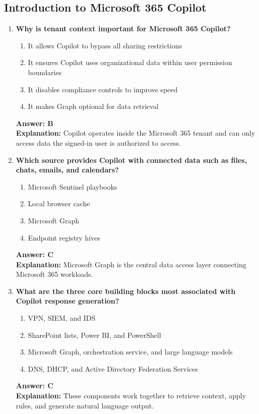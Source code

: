\documentclass[10pt]{article}
\begin{document}
\subsection{Introduction to Microsoft 365 Copilot}
\begin{enumerate}[leftmargin=*]

\item \textbf{Why is tenant context important for Microsoft 365 Copilot?}
\begin{enumerate}[label=\Alph*.]
  \item It allows Copilot to bypass all sharing restrictions
  \item It ensures Copilot uses organizational data within user permission boundaries
  \item It disables compliance controls to improve speed
  \item It makes Graph optional for data retrieval
\end{enumerate}
\textbf{Answer: B}\\
\textbf{Explanation:} Copilot operates inside the Microsoft 365 tenant and can only access data the signed-in user is authorized to access.

\item \textbf{Which source provides Copilot with connected data such as files, chats, emails, and calendars?}
\begin{enumerate}[label=\Alph*.]
  \item Microsoft Sentinel playbooks
  \item Local browser cache
  \item Microsoft Graph
  \item Endpoint registry hives
\end{enumerate}
\textbf{Answer: C}\\
\textbf{Explanation:} Microsoft Graph is the central data access layer connecting Microsoft 365 workloads.

\item \textbf{What are the three core building blocks most associated with Copilot response generation?}
\begin{enumerate}[label=\Alph*.]
  \item VPN, SIEM, and IDS
  \item SharePoint lists, Power BI, and PowerShell
  \item Microsoft Graph, orchestration service, and large language models
  \item DNS, DHCP, and Active Directory Federation Services
\end{enumerate}
\textbf{Answer: C}\\
\textbf{Explanation:} These components work together to retrieve context, apply rules, and generate natural language output.


\end{enumerate}
\end{document}
